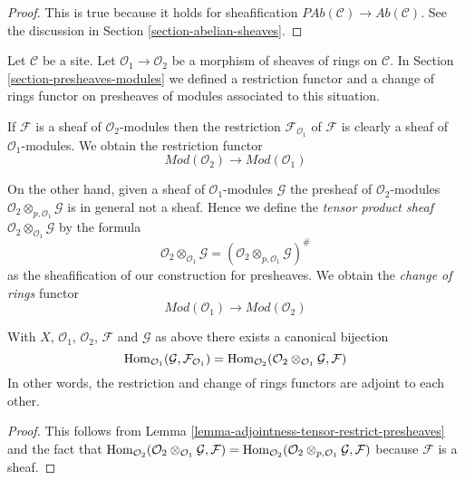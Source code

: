 \begin{proof}
This is true because it holds for sheafification
$\textit{PAb}(\mathcal{C}) \to \textit{Ab}(\mathcal{C})$.
See the discussion in Section \ref{section-abelian-sheaves}.
\end{proof}

\noindent
Let $\mathcal{C}$ be a site.
Let $\mathcal{O}_1 \to \mathcal{O}_2$ be
a morphism of sheaves of rings on $\mathcal{C}$.
In Section \ref{section-presheaves-modules}
we defined a restriction functor
and a change of rings functor on presheaves of modules
associated to this situation.

\medskip\noindent
If $\mathcal{F}$ is a sheaf of $\mathcal{O}_2$-modules
then the restriction $\mathcal{F}_{\mathcal{O}_1}$
of $\mathcal{F}$ is clearly a sheaf
of $\mathcal{O}_1$-modules. We obtain the restriction functor
$$
\textit{Mod}(\mathcal{O}_2)
\longrightarrow
\textit{Mod}(\mathcal{O}_1)
$$

\medskip\noindent
On the other hand, given a sheaf of $\mathcal{O}_1$-modules
$\mathcal{G}$ the presheaf of $\mathcal{O}_2$-modules
$\mathcal{O}_2 \otimes_{p, \mathcal{O}_1} \mathcal{G}$
is in general not a sheaf. Hence we define the
{\it tensor product sheaf}
$\mathcal{O}_2 \otimes_{\mathcal{O}_1} \mathcal{G}$
by the formula
$$
\mathcal{O}_2 \otimes_{\mathcal{O}_1} \mathcal{G}
=
(\mathcal{O}_2 \otimes_{p, \mathcal{O}_1} \mathcal{G})^\#
$$
as the sheafification of our construction for presheaves.
We obtain the {\it change of rings} functor
$$
\textit{Mod}(\mathcal{O}_1)
\longrightarrow
\textit{Mod}(\mathcal{O}_2)
$$

\begin{lemma}
\label{lemma-adjointness-tensor-restrict}
With $X$, $\mathcal{O}_1$, $\mathcal{O}_2$, $\mathcal{F}$ and
$\mathcal{G}$ as above there exists a canonical bijection
$$
\mathop{\rm Hom}\nolimits_{\mathcal{O}_1}(\mathcal{G}, \mathcal{F}_{\mathcal{O}_1})
=
\mathop{\rm Hom}\nolimits_{\mathcal{O}_2}(
\mathcal{O}_2 \otimes_{\mathcal{O}_1} \mathcal{G},
\mathcal{F}
)
$$
In other words, the restriction and change of rings functors
are adjoint to each other.
\end{lemma}

\begin{proof}
This follows from
Lemma \ref{lemma-adjointness-tensor-restrict-presheaves}
and the fact that
$\mathop{\rm Hom}\nolimits_{\mathcal{O}_2}(
\mathcal{O}_2 \otimes_{\mathcal{O}_1} \mathcal{G},
\mathcal{F}
)
=
\mathop{\rm Hom}\nolimits_{\mathcal{O}_2}(
\mathcal{O}_2 \otimes_{p, \mathcal{O}_1} \mathcal{G},
\mathcal{F}
)$
because $\mathcal{F}$ is a sheaf.
\end{proof}




